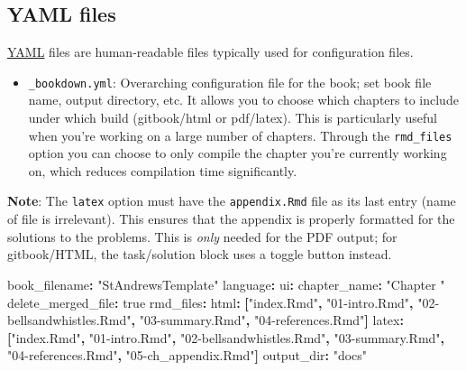 \documentclass[
]{book}
\newenvironment{Shaded}{\begin{snugshade}}{\end{snugshade}}
\newcommand{\AttributeTok}[1]{\textcolor[rgb]{0.77,0.63,0.00}{#1}}
\newcommand{\CharTok}[1]{\textcolor[rgb]{0.31,0.60,0.02}{#1}}
\newcommand{\FunctionTok}[1]{\textcolor[rgb]{0.00,0.00,0.00}{#1}}
\newcommand{\KeywordTok}[1]{\textcolor[rgb]{0.13,0.29,0.53}{\textbf{#1}}}
\newcommand{\StringTok}[1]{\textcolor[rgb]{0.31,0.60,0.02}{#1}}
\providecommand{\tightlist}{%
  \setlength{\itemsep}{0pt}\setlength{\parskip}{0pt}}
\theoremstyle{definition}
\theoremstyle{definition}
\theoremstyle{definition}
\theoremstyle{remark}
\begin{document}
\hypertarget{yaml-files}{%
\subsection*{YAML files}\label{yaml-files}}

\href{https://en.wikipedia.org/wiki/YAML}{YAML} files are human-readable files typically used for configuration files.

\begin{itemize}
\tightlist
\item
  \texttt{\_bookdown.yml}: Overarching configuration file for the book; set book file name, output directory, etc. It allows you to choose which chapters to include under which build (gitbook/html or pdf/latex). This is particularly useful when you're working on a large number of chapters. Through the \texttt{rmd\_files} option you can choose to only compile the chapter you're currently working on, which reduces compilation time significantly.
\end{itemize}

\textbf{Note}: The \texttt{latex} option must have the \texttt{appendix.Rmd} file as its last entry (name of file is irrelevant). This ensures that the appendix is properly formatted for the solutions to the problems. This is \emph{only} needed for the PDF output; for gitbook/HTML, the task/solution block uses a toggle button instead.

\begin{Shaded}
\begin{Highlighting}[]
\FunctionTok{book_filename}\KeywordTok{:}\AttributeTok{ }\StringTok{"StAndrewsTemplate"}
\FunctionTok{language}\KeywordTok{:}
\AttributeTok{  }\FunctionTok{ui}\KeywordTok{:}
\AttributeTok{    }\FunctionTok{chapter_name}\KeywordTok{:}\AttributeTok{ }\StringTok{"Chapter "}
\FunctionTok{delete_merged_file}\KeywordTok{:}\AttributeTok{ }\CharTok{true}
\FunctionTok{rmd_files}\KeywordTok{:}
\AttributeTok{  }\FunctionTok{html}\KeywordTok{:}\AttributeTok{ }\KeywordTok{[}\StringTok{"index.Rmd"}\KeywordTok{,}\AttributeTok{ }\StringTok{"01-intro.Rmd"}\KeywordTok{,}\AttributeTok{ }\StringTok{"02-bellsandwhistles.Rmd"}\KeywordTok{,}\AttributeTok{ }\StringTok{"03-summary.Rmd"}\KeywordTok{,}\AttributeTok{ }\StringTok{"04-references.Rmd"}\KeywordTok{]}
\AttributeTok{  }\FunctionTok{latex}\KeywordTok{:}\AttributeTok{ }\KeywordTok{[}\StringTok{"index.Rmd"}\KeywordTok{,}\AttributeTok{ }\StringTok{"01-intro.Rmd"}\KeywordTok{,}\AttributeTok{ }\StringTok{"02-bellsandwhistles.Rmd"}\KeywordTok{,}\AttributeTok{ }\StringTok{"03-summary.Rmd"}\KeywordTok{,}\AttributeTok{  }\StringTok{"04-references.Rmd"}\KeywordTok{,}\AttributeTok{ }\StringTok{"05-ch_appendix.Rmd"}\KeywordTok{]}
\FunctionTok{output_dir}\KeywordTok{:}\AttributeTok{ }\StringTok{"docs"}
\end{Highlighting}
\end{Shaded}
\end{document}
